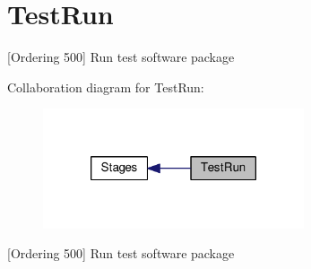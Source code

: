 \hypertarget{group__TestRun}{\section{Test\-Run}
\label{group__TestRun}
}


\mbox{[}Ordering 500\mbox{]} Run test software package  


Collaboration diagram for Test\-Run\-:
\nopagebreak
\begin{figure}[H]
\begin{center}
\leavevmode
\includegraphics[width=218pt]{group__TestRun}
\end{center}
\end{figure}
\mbox{[}Ordering 500\mbox{]} Run test software package 